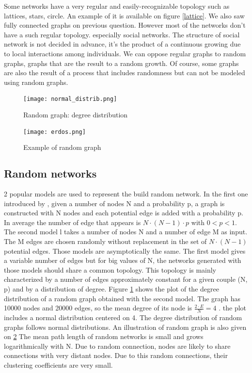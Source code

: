 \documentclass[a4paper, 12pt]{report}
\begin{document}
Some networks have a very regular and easily-recognizable topology such as lattices, stars, circle. An example of it is available on figure \ref{lattice}. We also saw fully connected graphs on previous question. However most of the networks don't have a such regular topology. especially social networks. The structure of social network is not decided in advance, it's the product of a continuous growing due to local interactions among individuals. We can oppose regular graphs to random graphs, graphs that are the result to a random growth. Of course, some graphs are also the result of a process that includes randomness but can not be modeled using random graphs.\\
\begin{figure}
\centering
\texttt{[image: normal\_distrib.png]}
\caption{Random graph: degree distribution}
\label{random}
\end{figure}

\begin{figure}
\centering
\texttt{[image: erdos.png]}
\caption{Example of random graph\citep{erdos_image}}
\label{erdos}
\end{figure}

\subsection{Random networks}
\label{random-section}
2 popular models are used to represent the build random network. In the first one introduced by \cite{erdosRandom}, given a number of nodes N and a probability p, a graph is constructed with N nodes and each potential edge is added with a probability p. In average the number of edge that appears is $N \cdot (N-1) \cdot p$ with $ 0< p <1$. The second model \citep{gilbertRandom} l takes a number of nodes N and a number of edge M as input. The M edges are chosen randomly without replacement in the set of $N \cdot (N-1)$ potential edges. Those models are asymptotically the same. The first model gives a variable number of edges but for big values of N, the networks generated with those models should share a common topology. This topology is mainly characterized by a number of edges approximately constant for a given couple (N, p) and by a distribution of degree. Figure \ref{random} shows the plot of the degree distribution of a random graph obtained with the second model. The graph has 10000 nodes and 20000 edges, so the mean degree of its node is  $\frac{2 \cdot E}{N} = 4$ . the plot includes a normal distribution centered on 4. The degree distribution of random graphs follows normal distributions.  An illustration of random graph is also given on \ref{erdos} The mean path length of random networks is small and grows logarithmically with N. Due to random connection, nodes are likely to share connections with very distant nodes. Due to this random connections, their clustering coefficients are very small.\\
\end{document}
